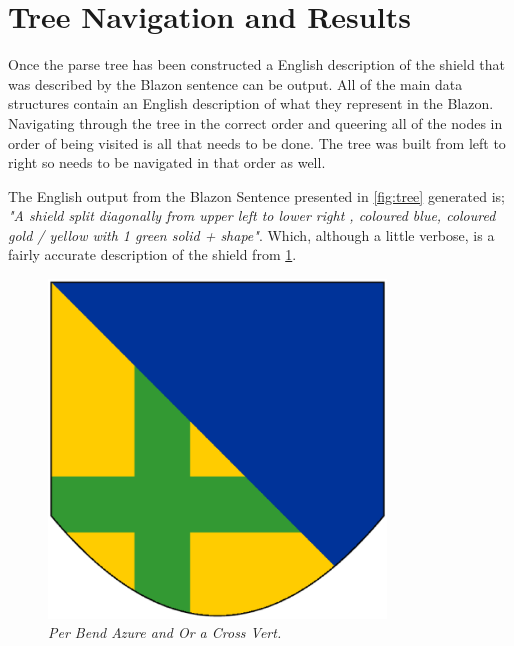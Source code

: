 \section{Tree Navigation and Results}

Once the parse tree has been constructed a English description of the shield that was described by the Blazon sentence can be output. 
All of the main data structures contain an English description of what they represent in the Blazon.  Navigating through the tree in the correct order and queering all of the nodes in order of being visited is all that needs to be done.  The tree was built from left to right so needs to be navigated in that order as well.  


The English output from the Blazon Sentence presented in \ref{fig:tree} generated is; \emph{"A shield split diagonally from upper left to lower right , coloured blue, coloured gold / yellow with 1 green solid + shape"}.  Which, although a little verbose, is a fairly accurate description of the shield from \ref{fig:result}.  



\begin{figure}[H]
  \centering
    \includegraphics[width=0.8\textwidth]{parsing/images/demo.eps}
  \caption{\emph{Per Bend Azure and Or a Cross Vert.}}
  \label{fig:result}
  
\end{figure}




